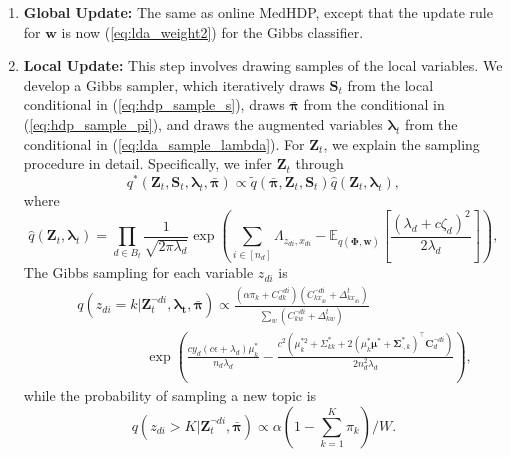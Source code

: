 \documentclass[twoside,11pt]{article}
\newcommand{\Zv}{\bm{Z}}
\newcommand{\Sv}{\bm{S}}
\newcommand{\wv}{\bm{w}}
\newcommand{\Phiv}{\bm{\Phi}}
\newcommand{\muv}{\bm \mu}
\newcommand{\lambdav}{\bm \lambda}
\newcommand{\barpiv}{\bm{\bar{\pi}}}
\newcommand{\Sigmav}{\bm \Sigma}
\newcommand{\ep}{\mathbb{E}}
\begin{document}
\begin{enumerate}
\item \textbf{Global Update: } The same as online MedHDP, except that the update rule for $\wv$ is now (\ref{eq:lda_weight2}) for the Gibbs classifier.
\item \textbf{Local Update: } This step involves drawing samples of the local variables. We develop a Gibbs sampler, which iteratively draws $\Sv_t$ from the local conditional in (\ref{eq:hdp_sample_s}), draws $\barpiv$ from the conditional in (\ref{eq:hdp_sample_pi}), and draws the augmented variables $\lambdav_t$ from the conditional in (\ref{eq:lda_sample_lambda}). For $\Zv_t$, we explain the sampling procedure in detail. Specifically,
we infer $\Zv_t$ through
\begin{equation} \label{eq:pamedhdp_zlambdas2}
q^*(\bm{Z}_t, \bm{S}_t, \lambdav_t, \barpiv)  \propto \tilde{q}(\barpiv, \bm{Z}_t, \bm{S}_t) \hat{q}(\bm{Z}_t, \lambdav_t),
\end{equation}
where
\begin{equation} \nonumber
\hat{q}(\bm{Z}_t, \lambdav_t) = \prod\limits_{d \in B_t} \frac{1}{\sqrt{2 \pi \lambda_d}}\exp\left( \sum\limits_{i \in [n_d]} \Lambda_{z_{di},x_{di}}- \ep_{q(\Phiv,\wv)}\left[ \frac{(\lambda_d+c\zeta_d)^2}{2\lambda_d} \right] \right),
\end{equation}
%
The Gibbs sampling for each variable $z_{di}$ is
\setlength\arraycolsep{-3pt} \begin{eqnarray}\label{eq:hdp_sample_z_gibbs}
&&q(z_{di} =  k| \bm{Z}_{t}^{\neg di}, \bm{\lambda_t}, \barpiv)   \propto  \frac{(\alpha \pi_k+C_{dk}^{\neg di}) (C_{kx_{di}}^{\neg di}+\Delta_{kx_{di}}^t) }{\sum_{w}{(C_{kw}^{\neg di}+\Delta_{kw}^t)}} \nonumber \\
&& ~~~~~~~~~~~~~~~~~~~~~~ \exp\left( \frac{c y_d(c\epsilon + \lambda_d) \mu_k^*}{n_d \lambda_d}\!-\!\frac{c^2 (\mu_{k}^{*2}+\Sigma_{kk}^* + 2 (\mu_k^* \muv^* + \Sigmav_{\cdot, k}^* )^\top \bm{C}_{d}^{\neg di} ) }{2 n_d^2 \lambda_d} \right),
\end{eqnarray}
while the probability of sampling a new topic is
\setlength\arraycolsep{1pt} \begin{equation*}\label{eq:hdp_sample_z2}
q(z_{di} > K | \Zv_{t}^{\neg di}, \barpiv) \propto \alpha \left( 1-\sum\limits_{k = 1}^{K}{\pi_k}\right)/W.
\end{equation*}



\end{enumerate}
\end{document}
